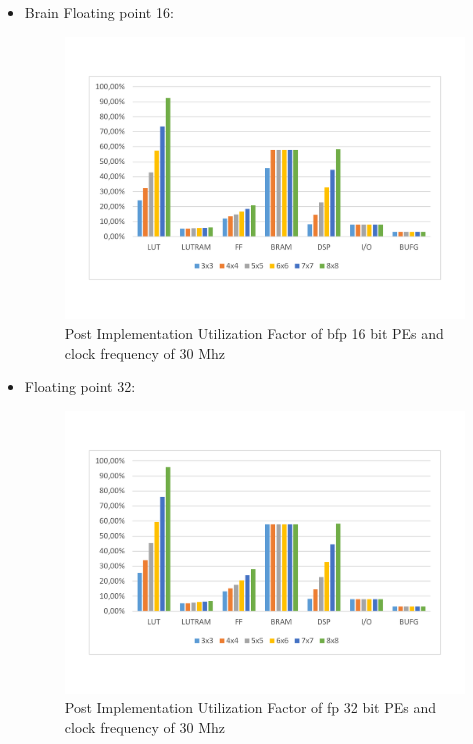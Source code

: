 \begin{itemize}
\begin{figure}[!htbp]
\label{fig:ut64bit}
\end{figure}
\item Brain Floating point 16:
\begin{figure}[!htbp]
\centering
\captionsetup{justification=centering}
\includegraphics[scale=0.35,angle=0]{./figure/graphs/utilization_factor_30mhz_bfp16.pdf}
\caption{Post Implementation Utilization Factor of bfp 16 bit PEs and clock frequency of 30 Mhz}
\label{fig:utbpf16bit}
\end{figure}
\newpage
\item Floating point 32:
\begin{figure}[!htbp]
\centering
\captionsetup{justification=centering}
\includegraphics[scale=0.35,angle=0]{./figure/graphs/utilization_factor_30mhz_fp32.pdf}
\caption{Post Implementation Utilization Factor of fp 32 bit PEs and clock frequency of 30 Mhz}
\label{fig:utfp32bit}
\end{figure}
\end{itemize}
